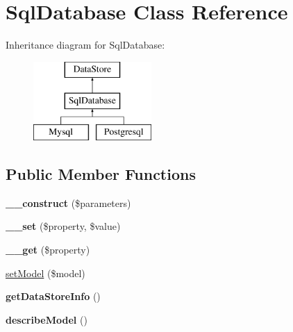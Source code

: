 \hypertarget{class_sql_database}{
\section{SqlDatabase Class Reference}
\label{class_sql_database}
}
Inheritance diagram for SqlDatabase:\begin{figure}[H]
\begin{center}
\leavevmode
\includegraphics[height=3.000000cm]{class_sql_database}
\end{center}
\end{figure}
\subsection*{Public Member Functions}
\begin{DoxyCompactItemize}
\item 
\hypertarget{class_sql_database_a7986a2fe6d66ac3ea19ed8e5204a1929}{
{\bfseries \_\-\_\-construct} (\$parameters)}
\label{class_sql_database_a7986a2fe6d66ac3ea19ed8e5204a1929}

\item 
\hypertarget{class_sql_database_a18bbc7f4dee3537fbaba67e7e2754115}{
{\bfseries \_\-\_\-set} (\$property, \$value)}
\label{class_sql_database_a18bbc7f4dee3537fbaba67e7e2754115}

\item 
\hypertarget{class_sql_database_a08902d448b83b8e678ef2c43763babbb}{
{\bfseries \_\-\_\-get} (\$property)}
\label{class_sql_database_a08902d448b83b8e678ef2c43763babbb}

\item 
\hyperlink{class_sql_database_a09169244b257c1ecc216e0201db22b26}{setModel} (\$model)
\item 
\hypertarget{class_sql_database_a6339427c7ac03840595d507b6c47fab0}{
{\bfseries getDataStoreInfo} ()}
\label{class_sql_database_a6339427c7ac03840595d507b6c47fab0}

\item 
\hypertarget{class_sql_database_a8040b7e1064cdfd65f0db8922d86450d}{
{\bfseries describeModel} ()}
\label{class_sql_database_a8040b7e1064cdfd65f0db8922d86450d}

\end{DoxyCompactItemize}
